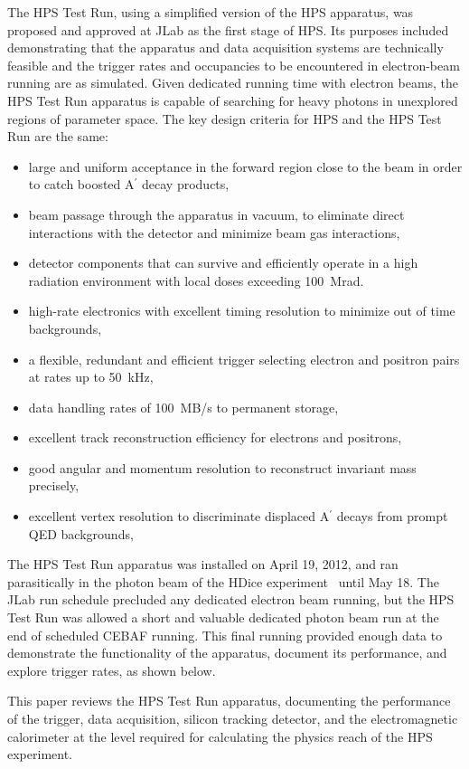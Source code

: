 \documentclass[final,3p,times,twocolumn]{elsarticle}
\newcommand{\Aprime}{A\ensuremath{^\prime}}
\begin{document}
The HPS Test Run, using a simplified version of the HPS apparatus, was proposed and 
approved at JLab as the first stage of HPS. 
Its purposes included demonstrating that the apparatus and data acquisition systems are 
technically feasible and  the trigger rates and occupancies to be encountered in electron-beam 
running are as simulated. Given dedicated running time with electron beams, the HPS Test Run 
apparatus is capable of searching for heavy photons in unexplored regions of parameter space.    
The key design criteria for HPS and the HPS Test Run are the same:
\begin{itemize}
\item large and uniform acceptance in the forward region close to the beam in order to catch boosted 
\Aprime{} decay products,
\item beam passage through the apparatus in vacuum, to eliminate direct interactions with the 
detector and minimize beam gas interactions, 
\item detector components that can survive and efficiently operate in a high radiation environment 
with local doses exceeding 100~Mrad.
\item high-rate electronics with excellent timing resolution to minimize out of time backgrounds,
\item a flexible, redundant and efficient trigger selecting electron and positron pairs at rates up to 
50~kHz,
\item data handling rates of 100~MB/s to permanent storage,
\item excellent track reconstruction efficiency for electrons and positrons,
\item good angular and momentum resolution to reconstruct invariant mass precisely,
\item excellent vertex resolution to discriminate displaced \Aprime{} decays from prompt QED 
backgrounds,
\end{itemize}


The HPS Test Run apparatus was installed on April 19, 2012, and ran parasitically in the photon beam of the HDice 
experiment~\cite{HDice} until May 18. The JLab run schedule 
precluded any dedicated electron beam running, but the HPS Test Run was allowed a short and 
valuable dedicated photon beam run at the end of scheduled CEBAF running. This final running 
provided enough data to demonstrate the functionality of the apparatus, document its performance, and
explore trigger rates, as shown below. 

This paper reviews the HPS Test Run apparatus, documenting the performance of the trigger, 
data acquisition, silicon tracking detector, and the electromagnetic calorimeter at the level required for 
calculating the physics reach of the HPS experiment. 
\end{document}
